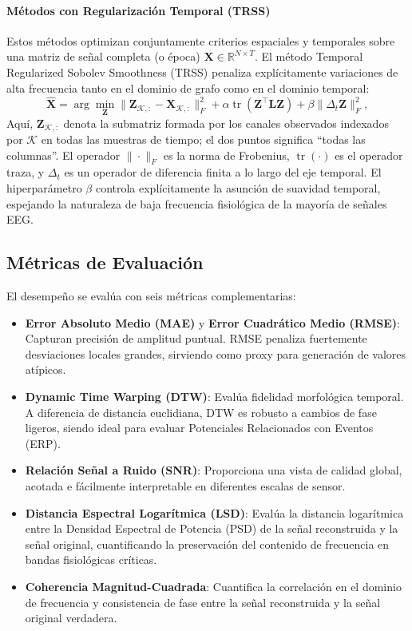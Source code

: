 \paragraph{Métodos con Regularización Temporal (TRSS)} 
Estos métodos optimizan conjuntamente criterios espaciales y temporales sobre una matriz de señal completa (o época) $\mathbf{X} \in \mathbb{R}^{N \times T}$. El método Temporal Regularized Sobolev Smoothness (TRSS) \cite{giraldo2022} penaliza explícitamente variaciones de alta frecuencia tanto en el dominio de grafo como en el dominio temporal:
\begin{equation}
  \hat{\mathbf{X}} = \arg\min_{\mathbf{Z}}
    \|\mathbf{Z}_{\mathcal{K}, :} - \mathbf{X}_{\mathcal{K}, :}\|_F^2
    + \alpha \operatorname{tr}(\mathbf{Z}^\top \mathbf{L} \mathbf{Z})
    + \beta \|\Delta_t \mathbf{Z}\|_F^2,
  \label{eq:sobolev}
\end{equation}
Aquí, $\mathbf{Z}_{\mathcal{K}, :}$ denota la submatriz formada por los canales observados indexados por $\mathcal{K}$ en todas las muestras de tiempo; el dos puntos significa ``todas las columnas''. El operador $\|\cdot\|_F$ es la norma de Frobenius, $\operatorname{tr}(\cdot)$ es el operador traza, y $\Delta_t$ es un operador de diferencia finita a lo largo del eje temporal. El hiperparámetro $\beta$ controla explícitamente la asunción de suavidad temporal, espejando la naturaleza de baja frecuencia fisiológica de la mayoría de señales EEG.

\subsection{Métricas de Evaluación}

El desempeño se evalúa con seis métricas complementarias:
\begin{itemize}
\item \textbf{Error Absoluto Medio (MAE)} y \textbf{Error Cuadrático Medio (RMSE)}: Capturan precisión de amplitud puntual. RMSE penaliza fuertemente desviaciones locales grandes, sirviendo como proxy para generación de valores atípicos.
\item \textbf{Dynamic Time Warping (DTW)}: Evalúa fidelidad morfológica temporal. A diferencia de distancia euclidiana, DTW es robusto a cambios de fase ligeros, siendo ideal para evaluar Potenciales Relacionados con Eventos (ERP).
\item \textbf{Relación Señal a Ruido (SNR)}: Proporciona una vista de calidad global, acotada e fácilmente interpretable en diferentes escalas de sensor.
\item \textbf{Distancia Espectral Logarítmica (LSD)}: Evalúa la distancia logarítmica entre la Densidad Espectral de Potencia (PSD) de la señal reconstruida y la señal original, cuantificando la preservación del contenido de frecuencia en bandas fisiológicas críticas.
\item \textbf{Coherencia Magnitud-Cuadrada}: Cuantifica la correlación en el dominio de frecuencia y consistencia de fase entre la señal reconstruida y la señal original verdadera.
\end{itemize}

